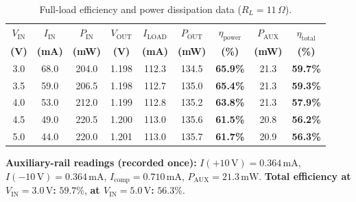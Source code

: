 \documentclass[11pt,a4paper]{article}
\begin{document}
\begin{table}[H]
\centering
\caption{Full-load efficiency and power dissipation data ($R_L = 11\,\Omega$).}
\label{tab:efficiency}
\begin{tabular}{@{}ccccccccc@{}}
\toprule
\textbf{$V_{\mathrm{IN}}$} & \textbf{$I_{\mathrm{IN}}$} & \textbf{$P_{\mathrm{IN}}$} & \textbf{$V_{\mathrm{OUT}}$} & \textbf{$I_{\mathrm{LOAD}}$} & \textbf{$P_{\mathrm{OUT}}$} & \textbf{$\eta_{\mathrm{power}}$} & \textbf{$P_{\mathrm{AUX}}$} & \textbf{$\eta_{\mathrm{total}}$} \\
\textbf{(V)} & \textbf{(mA)} & \textbf{(mW)} & \textbf{(V)} & \textbf{(mA)} & \textbf{(mW)} & \textbf{(\%)} & \textbf{(mW)} & \textbf{(\%)} \\ \midrule
3.0 & 68.0 & 204.0 & 1.198 & 112.3 & 134.5 & \textbf{65.9\%} & 21.3 & \textbf{59.7\%} \\
3.5 & 59.0 & 206.5 & 1.198 & 112.7 & 135.0 & \textbf{65.4\%} & 21.3 & \textbf{59.3\%} \\
4.0 & 53.0 & 212.0 & 1.199 & 112.8 & 135.2 & \textbf{63.8\%} & 21.3 & \textbf{57.9\%} \\
4.5 & 49.0 & 220.5 & 1.200 & 113.0 & 135.6 & \textbf{61.5\%} & 20.8 & \textbf{56.2\%} \\
5.0 & 44.0 & 220.0 & 1.201 & 113.0 & 135.7 & \textbf{61.7\%} & 20.9 & \textbf{56.3\%} \\
\bottomrule
\end{tabular}
\end{table}

\noindent \textbf{Auxiliary-rail readings (recorded once):} $I(+10\,\mathrm{V}) = 0.364\,\mathrm{mA}$, $I(-10\,\mathrm{V}) = 0.364\,\mathrm{mA}$, $I_{\mathrm{comp}} = 0.710\,\mathrm{mA}$, $P_{\mathrm{AUX}} = 21.3\,\mathrm{mW}$. \textbf{Total efficiency at $V_{\mathrm{IN}} = 3.0\,\mathrm{V}$:} $\mathbf{59.7\%}$, \textbf{at $V_{\mathrm{IN}} = 5.0\,\mathrm{V}$:} $\mathbf{56.3\%}$.
\end{document}
